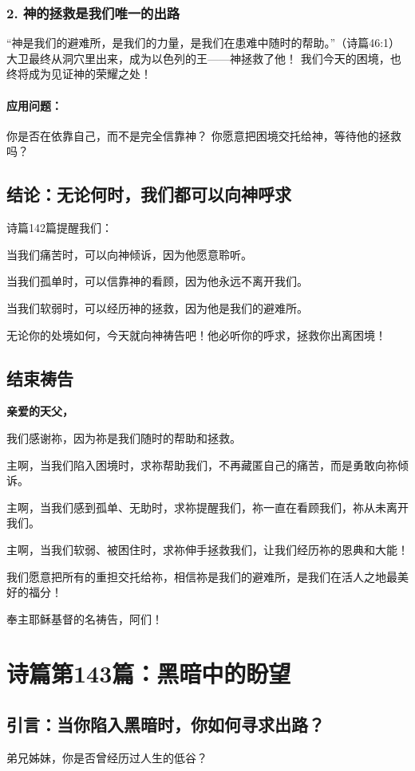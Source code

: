 \documentclass[a4paper, 12pt]{article}
\begin{document}
\subsubsection*{2. 神的拯救是我们唯一的出路}
“神是我们的避难所，是我们的力量，是我们在患难中随时的帮助。”（诗篇46:1）
大卫最终从洞穴里出来，成为以色列的王——神拯救了他！
我们今天的困境，也终将成为见证神的荣耀之处！
\paragraph*{应用问题：}
你是否在依靠自己，而不是完全信靠神？
你愿意把困境交托给神，等待他的拯救吗？
\subsection*{结论：无论何时，我们都可以向神呼求}
诗篇142篇提醒我们：

当我们痛苦时，可以向神倾诉，因为他愿意聆听。

当我们孤单时，可以信靠神的看顾，因为他永远不离开我们。

当我们软弱时，可以经历神的拯救，因为他是我们的避难所。

无论你的处境如何，今天就向神祷告吧！他必听你的呼求，拯救你出离困境！

\subsection*{结束祷告}
\textbf{亲爱的天父，}

我们感谢祢，因为祢是我们随时的帮助和拯救。

主啊，当我们陷入困境时，求祢帮助我们，不再藏匿自己的痛苦，而是勇敢向祢倾诉。

主啊，当我们感到孤单、无助时，求祢提醒我们，祢一直在看顾我们，祢从未离开我们。

主啊，当我们软弱、被困住时，求祢伸手拯救我们，让我们经历祢的恩典和大能！

我们愿意把所有的重担交托给祢，相信祢是我们的避难所，是我们在活人之地最美好的福分！

奉主耶稣基督的名祷告，阿们！
\newpage
\section{诗篇第143篇：黑暗中的盼望}
\subsection*{引言：当你陷入黑暗时，你如何寻求出路？}
弟兄姊妹，你是否曾经历过人生的低谷？
\end{document}
